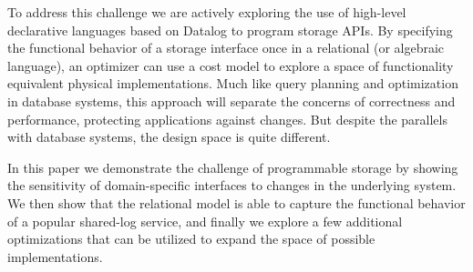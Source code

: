To address this challenge we are actively exploring the use of high-level
declarative languages based on Datalog to program storage APIs. By specifying
the functional behavior of a storage interface once in a relational (or
algebraic language), an optimizer can use a cost model to explore a space of
functionality equivalent physical implementations. Much like query planning and
optimization in database systems, this approach will separate the concerns of
correctness and performance, protecting applications against changes. But
despite the parallels with database systems, the design space is quite
different.

In this paper we demonstrate the challenge of programmable storage by showing
the sensitivity of domain-specific interfaces to changes in the underlying
system. We then show that the relational model is able to capture the
functional behavior of a popular shared-log service, and finally we explore a
few additional optimizations that can be utilized to expand the space of
possible implementations.
